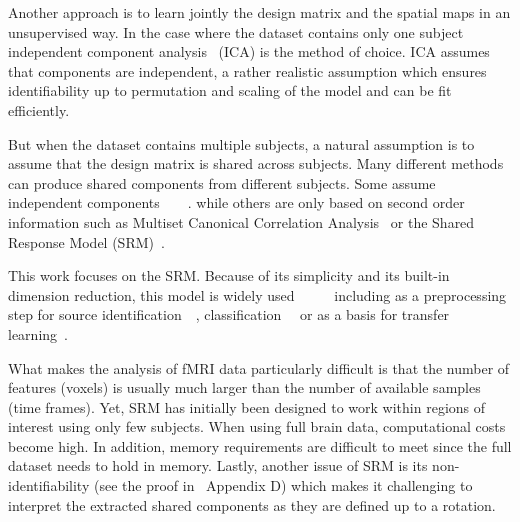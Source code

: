 \documentclass{article}
\begin{document}
Another approach is to learn jointly the design matrix and the spatial maps in
an unsupervised way.
%
In the case where the dataset contains only one subject
independent component analysis~\cite{jutten1991blind} (ICA) is the method of choice.
%
ICA assumes that components are independent, a rather realistic assumption which
ensures identifiability up to permutation and scaling of the model and can be fit efficiently.
%

But when the dataset contains multiple subjects, a natural assumption is to
assume that the design matrix is shared across subjects.
%
Many different methods
can produce shared components from different subjects. Some assume independent
components~\cite{richard2021model}~\cite{richard2020modeling}~\cite{varoquaux2009canica}~\cite{calhoun2001method}.
while others are only based on second order information such as Multiset
Canonical Correlation Analysis~\cite{via2011joint} or the Shared Response Model (SRM)~\cite{chen2015reduced}.
%

This work focuses on the SRM. Because of its
simplicity and its built-in dimension reduction, this model is widely
used~\cite{baldassano2017discovering}~\cite{cohen2017computational}~\cite{baldassano2018representation}~\cite{jolly2020custom}~\cite{lee2021anticipation}
including as a preprocessing step for source
identification~\cite{richard2021model}~\cite{richard2020modeling},
classification~\cite{turek2018capturing}~\cite{chen2017shared}\cite{zhang2016searchlight} or as a basis for transfer learning~\cite{zhang2018transfer}. 


What makes the analysis of fMRI data particularly difficult is that
the number of features (voxels) is usually much
larger than the number of available samples (time frames).
Yet, SRM has initially been designed to work within regions of interest using
only few subjects.
%
When using full brain data, computational costs become
high.
%
In addition, memory requirements are difficult to meet since the full dataset
needs to hold in memory.
%
Lastly, another issue of SRM is its non-identifiability (see the proof
in~\cite{richard2020modeling} Appendix D) which makes it challenging to
interpret the extracted shared components as they are defined up to a rotation.
%
\end{document}
